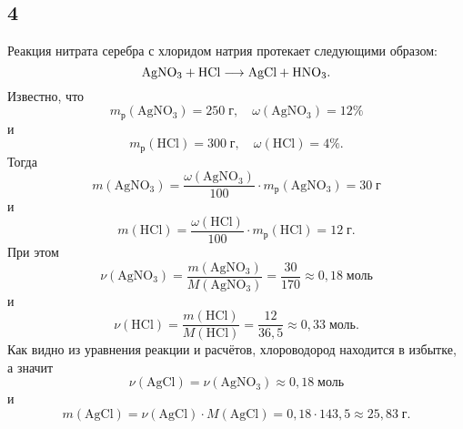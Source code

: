 \subsection{4}

Реакция нитрата серебра с хлоридом натрия протекает следующими образом:
\[
\rm AgNO_3+HCl\longrightarrow AgCl+HNO_3.
\]
Известно, что
\[
m_\text{р}(\mathrm{AgNO_3})=250\;\text{г},\quad\omega(\mathrm{AgNO_3})=12\%
\]
и
\[
m_\text{р}(\mathrm{HCl})=300\;\text{г},\quad\omega(\mathrm{HCl})=4\%.
\]
Тогда
\[
m(\mathrm{AgNO_3})=\frac{\omega(\mathrm{AgNO_3})}{100}\cdot m_\text{р}(\mathrm{AgNO_3})=30\;\text{г}
\]
и
\[
m(\mathrm{HCl})=\frac{\omega(\mathrm{HCl})}{100}\cdot m_\text{р}(\mathrm{HCl})=12\;\text{г}.
\]
При этом
\[
\nu(\mathrm{AgNO_3})=\frac{m(\mathrm{AgNO_3})}{M(\mathrm{AgNO_3})}=\frac{30}{170}\approx{0{,}18}\;\text{моль}
\]
и
\[
\nu(\mathrm{HCl})=\frac{m(\mathrm{HCl})}{M(\mathrm{HCl})}=\frac{12}{36{,}5}\approx{0{,}33}\;\text{моль}.
\]
Как видно из уравнения реакции и расчётов, хлороводород находится в избытке, а значит
\[
\nu(\mathrm{AgCl})=\nu(\mathrm{AgNO_3})\approx{0{,}18}\;\text{моль}
\]
и
\[
m(\mathrm{AgCl})=\nu(\mathrm{AgCl})\cdot M(\mathrm{AgCl})=0{,}18\cdot143{,}5\approx25{,}83\;\text{г}.
\]